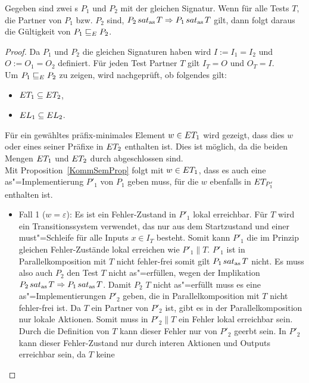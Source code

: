 \begin{Lem}
  \label{KommTestVerfeinLem}
  Gegeben sind zwei \MEIO{}s $P_1$ und $P_2$ mit der gleichen Signatur. Wenn
  für alle Tests $T$, die Partner von $P_1$ bzw. $P_2$ sind, $P_2\hspace{0.05cm}sat_\mathrm{as}\hspace{0.05cm} T
  \Rightarrow P_1\hspace{0.05cm}sat_\mathrm{as}\hspace{0.05cm} T$ gilt, dann folgt daraus die Gültigkeit von $P_1 \sqsubseteq  _E
  P_2$.
\end{Lem}
\begin{proof}
  Da $P_1$ und $P_2$ die gleichen Signaturen haben wird $I:=I_1=I_2$ und $O:=
  O_1=O_2$ definiert. Für jeden Test Partner $T$ gilt $I_T=O$ und $O_T=I$.\\
  Um $P_1 \sqsubseteq  _E P_2$ zu zeigen, wird nachgeprüft, ob folgendes gilt:
  \begin{itemize}
    \item $ET _1\subseteq ET _2$,
    \item $EL _1\subseteq EL _2$.
  \end{itemize}
  Für ein gewähltes präfix-minimales Element $w\in ET _1$ wird gezeigt, dass
  dies $w$ oder eines seiner Präfixe in $ET _2$ enthalten ist. Dies ist
  möglich, da die beiden Mengen $ET _1$ und $ET _2$ durch \cont{}
  abgeschlossen sind.\\
  Mit Proposition~\ref{KommSemProp} folgt mit $w\in ET _1$, dass es auch eine
  as"=Implementierung $P'_1$ von $P_1$ geben muss, für die $w$ ebenfalls in
  $ET _{P'_1}$ enthalten ist.
  \begin{itemize}
    \item Fall 1 ($w=\varepsilon$): Es ist ein Fehler-Zustand in $P'_1$ lokal
      erreichbar. Für $T$ wird ein Transitionssystem verwendet, das nur aus dem
      Startzustand und einer must"=Schleife für alle Inputs $x\in I_T$ besteht.
      Somit kann $P'_1$ die im Prinzip gleichen Fehler-Zustände lokal
      erreichen wie $P'_1\|T$. $P'_1$ ist in Parallelkomposition mit $T$ nicht
      fehler-frei somit gilt $P_1\hspace{0.05cm}sat_\mathrm{as}\hspace{0.05cm} T$ nicht. Es muss also auch $P_2$ den
      Test $T$ nicht as"=erfüllen, wegen der Implikation $P_2\hspace{0.05cm}sat_\mathrm{as}\hspace{0.05cm} T
      \Rightarrow P_1\hspace{0.05cm}sat_\mathrm{as}\hspace{0.05cm} T$. Damit $P_2$ $T$ nicht as"=erfüllt muss es eine
      as"=Implementierungen $P'_2$ geben, die in Parallelkomposition mit $T$
      nicht fehler-frei ist. Da $T$ ein Partner von $P'_2$ ist, gibt es in der
      Parallelkomposition nur lokale Aktionen. Somit muss in $P'_2\|T$ ein
      Fehler lokal erreichbar sein. Durch die Definition von $T$ kann dieser
      Fehler nur von $P'_2$ geerbt sein. In $P'_2$ kann dieser Fehler-Zustand
      nur durch interen Aktionen und Outputs erreichbar sein, da $T$ keine

\end{itemize}
\end{proof}
